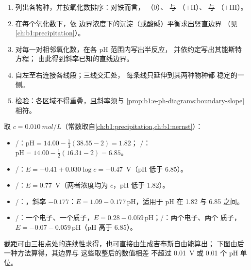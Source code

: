 \begin{method}[绘制电势--pH 图]\label{met:b1:e-ph-diagrams:build}
\begin{enumerate}
  \item 列出各物种，并按氧化数排序：对铁而言，
        （0）、 与 （$+$II）、 与
        （$+$III）。
  \item 在每个氧化数下，依
        边界浓度下的沉淀（或酸碱）平衡求出竖直边界
        （见\cref{ch:b1:precipitation}）。
  \item 对每一对相邻氧化数，在各 pH 范围内写出半反应，
        并依约定写出其能斯特方程；
        由此得到斜率已知的直线边界。
  \item 自左至右连接各线段；三线交汇处，
        每条线只延伸到其两种物种都
        稳定的一侧。
  \item 检验：各区域不得重叠，且斜率须与
        \cref{prop:b1:e-ph-diagrams:boundary-slope}相符。
\end{enumerate}
\end{method}

\begin{example}[铁的边界]\label{ex:b1:e-ph-diagrams:iron}
取 $c = \qty{0.010}{mol/L}$（常数取自\cref{ch:b1:precipitation,ch:b1:nernst}）：
\begin{itemize}
  \item {}/：$\mathrm{pH} = 14.00 - \frac13(38.55 - 2) = 1.82$；
        /：$\mathrm{pH} = 14.00 - \frac12(16.31 - 2) = 6.85$。
  \item {}/：$E = -0.41 + 0.030\log c = -0.47$~V（pH 低于 6.85）。
  \item {}/：$E = 0.77$~V（两者浓度均为 $c$，pH 低于 1.82）。
  \item {}/：，斜率
        $-0.177$：$E = 1.09 - 0.177\,\mathrm{pH}$，适用于 pH 在 1.82 与 6.85 之间。
  \item {}/：一个电子、一个质子，$E = 0.28 -
        0.059\,\mathrm{pH}$；/：两个电子、两个
        质子，$E = -0.07 - 0.059\,\mathrm{pH}$（pH 高于 6.85）。
\end{itemize}
截距可由三相点处的连续性求得，也可直接由生成吉布斯自由能算出；
下图由后一种方法算得，其边界与
这些取整后的数值相差
不超过 \qty{0.01}{V} 或 0.01 个 pH 单位。
\end{example}

